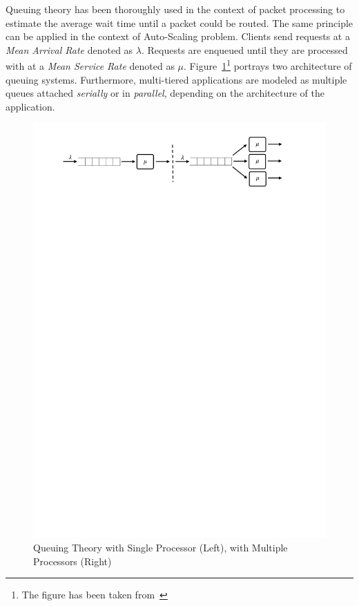 Queuing theory has been thoroughly used in the context of packet processing to estimate the average wait time until a packet could be routed. The same principle can be applied in the context of Auto-Scaling problem. Clients send requests at a \emph{Mean Arrival Rate} denoted as $\lambda$. Requests are enqueued until they are processed with at a \emph{Mean Service Rate} denoted as $\mu$. Figure~\ref{fig:queue}\footnote{The figure has been taken from~\textcite{Lorido-Botran2014}} portrays two architecture of queuing systems. Furthermore, multi-tiered applications are modeled as multiple queues attached \emph{serially} or in \emph{parallel}, depending on the architecture of the application.
\begin{figure}[h]
    \centering
    \includegraphics[clip, trim=2cm 25cm 3cm 1cm]{queue.pdf}
    \caption{Queuing Theory with Single Processor (Left), with Multiple Processors (Right)}
    \label{fig:queue}
\end{figure}

